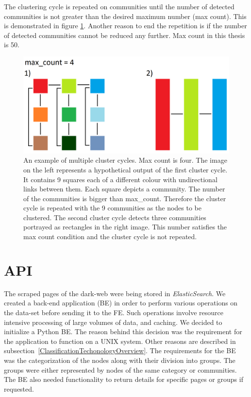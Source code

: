 The clustering cycle is repeated on communities until the number of detected communities is not greater than the desired maximum number (max count). This is demonstrated in figure \ref{clusteringCyclesExample}. Another reason to end the repetition is if the number of detected communities cannot be reduced any further. Max count in this thesis is 50.
\begin{figure}[ht!]
  \centering
  \includegraphics[width=\textwidth]{Images/clusteringCyclesExample.png}
  \caption{An example of multiple cluster cycles. Max count is four. The image on the left represents a hypothetical output of the first cluster cycle. It contains 9 squares each of a different colour with undirectional links between them. Each square depicts a community. The number of the communities is bigger than max\_count. Therefore the cluster cycle is repeated with the 9 communities as the nodes to be clustered. The second cluster cycle detects three communities portrayed as rectangles in the right image. This number satisfies the max count condition and the cluster cycle is not repeated.}
  \label{clusteringCyclesExample}
\end{figure} 

\section{API}\label{APIDevelopment}
The scraped pages of the dark-web were being stored in \textit{ElasticSearch}. We created a back-end application (BE) in order to perform various operations on the data-set before sending it to the FE. Such operations involve resource intensive processing of large volumes of data, and caching. We decided to initialize a Python BE. The reason behind this decision was the requirement for the application to function on a UNIX system. Other reasons are described in subsection~\ref{ClassificationTechonologyOverview}. The requirements for the BE was the categorization of the nodes along with their division into groups. The groups were either represented by nodes of the same category or communities. The BE also needed functionality to return details for specific pages or groups if requested.
